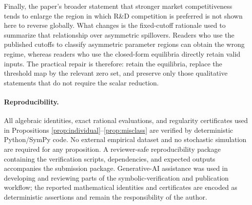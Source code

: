 Finally, the paper's broader statement that stronger market competitiveness tends to enlarge the region in which R\&D competition is preferred is not shown here to reverse globally. What changes is the fixed-cutoff rationale used to summarize that relationship over asymmetric spillovers. Readers who use the published cutoffs to classify asymmetric parameter regions can obtain the wrong regime, whereas readers who use the closed-form equilibria directly retain valid inputs. The practical repair is therefore: retain the equilibria, replace the threshold map by the relevant zero set, and preserve only those qualitative statements that do not require the scalar reduction.

\paragraph{Reproducibility.}
All algebraic identities, exact rational evaluations, and regularity certificates used in Propositions \ref{prop:individual}--\ref{prop:misclass} are verified by deterministic Python/SymPy code. No external empirical dataset and no stochastic simulation are required for any proposition. A reviewer-safe reproducibility package containing the verification scripts, dependencies, and expected outputs accompanies the submission package. Generative-AI assistance was used in developing and reviewing parts of the symbolic-verification and publication workflow; the reported mathematical identities and certificates are encoded as deterministic assertions and remain the responsibility of the author.
